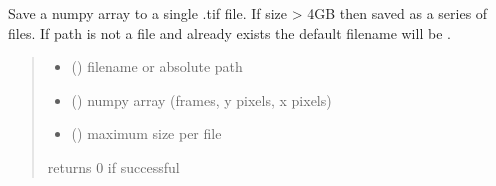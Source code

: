 \documentclass[letterpaper,10pt,english]{sphinxmanual}
\begin{document}
\begin{fulllineitems}
\label{\detokenize{CalSciPy.io_tools:CalSciPy.io_tools.save_images}}
\pysigstartsignatures
{}
\pysigstopsignatures
\sphinxAtStartPar
Save a numpy array to a single .tif file. If size \textgreater{} 4GB then saved as a series of files. If path is not a file and
already exists the default filename will be .
\begin{quote}\begin{description}
\begin{itemize}
\item {} 
\sphinxAtStartPar
{} () \textendash{} filename or absolute path

\item {} 
\sphinxAtStartPar
{} () \textendash{} numpy array (frames, y pixels, x pixels)

\item {} 
\sphinxAtStartPar
{} () \textendash{} maximum size per file

\end{itemize}

\sphinxAtStartPar
returns 0 if successful

\sphinxAtStartPar
{}

\end{description}\end{quote}

\end{fulllineitems}
\end{document}
